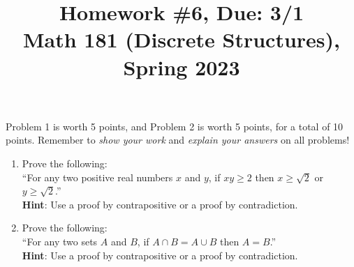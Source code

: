 \documentclass[11pt]{article}
\title{Homework \#6, Due: 3/1 \\Math 181 (Discrete Structures), Spring 2023}
\date{}
\begin{document}
\maketitle

\thispagestyle{empty}

\vspace{-1cm}

Problem 1 is worth 5 points, and Problem 2 is worth 5 points, for a total of 10 points. Remember to \emph{show your work} and \emph{explain your answers} on all problems!

\begin{enumerate}
\item Prove the following: \\
``For any two positive real numbers $x$ and $y$, if $xy \geq 2$ then $x \geq \sqrt{2}$ or~$y \geq \sqrt{2}$.'' \\
{\bf Hint}: Use a proof by contrapositive or a proof by contradiction.

\item Prove the following: \\
``For any two sets $A$ and $B$, if $A\cap B = A\cup B$ then $A=B$.'' \\
{\bf Hint}: Use a proof by contrapositive or a proof by contradiction.
\end{enumerate}
\end{document}
